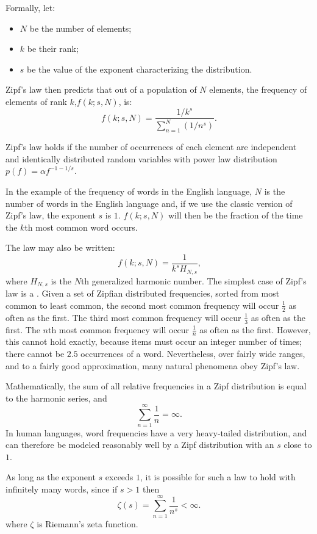       Formally, let:
      \begin{itemize}
        \item $N$ be the number of elements;
        \item $k$ be their rank;
        \item $s$ be the value of the exponent characterizing the distribution.
      \end{itemize}
      Zipf's law then predicts that out of a population of $N$ elements, the frequency of elements of rank $k\mbox{,} f(k;s,N)$, is:
      $$f(k;s,N)=\frac{1/k^s}{\sum_{n=1}^N (1/n^s)}\mbox{.}$$

      Zipf's law holds if the number of occurrences of each element are independent and identically distributed random variables with power law distribution $p(f) = \alpha f^{-1-1/s}$.\cite{AdamicHuberman2002}

      In the example of the frequency of words in the English language, $N$ is the number of words in the English language and, if we use the classic version of Zipf's law, the exponent $s$ is $1$. $f(k; s,N)$ will then be the fraction of the time the $k$th most common word occurs.

      The law may also be written:
      $$f(k;s,N)=\frac{1}{k^s H_{N,s}}\mbox{,}$$
      where $H_{N,s}$ is the $N$th generalized harmonic number.
The simplest case of Zipf's law is a . Given a set of Zipfian distributed frequencies, sorted from most common to least common, the second most common frequency will occur $\frac{1}{2}$ as often as the first. The third most common frequency will occur $\frac{1}{3}$ as often as the first. The $n$th most common frequency will occur $\frac{1}{n}$ as often as the first. However, this cannot hold exactly, because items must occur an integer number of times; there cannot be $2.5$ occurrences of a word. Nevertheless, over fairly wide ranges, and to a fairly good approximation, many natural phenomena obey Zipf's law.

      Mathematically, the sum of all relative frequencies in a Zipf distribution is equal to the harmonic series, and
      $$\sum_{n=1}^\infty \frac{1}{n}=\infty\mbox{.}$$
      In human languages, word frequencies have a very heavy-tailed distribution, and can therefore be modeled reasonably well by a Zipf distribution with an $s$ close to $1$.

      As long as the exponent $s$ exceeds $1$, it is possible for such a law to hold with infinitely many words, since if $s > 1$ then
      $$\zeta (s) = \sum_{n=1}^\infty \frac{1}{n^s}<\infty\mbox{.}$$
where $\zeta$ is Riemann's zeta function.

